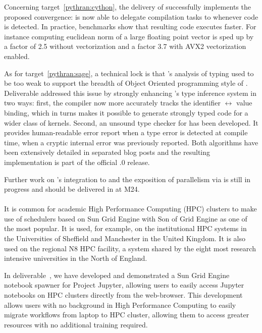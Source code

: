 \documentclass{deliverablereport}
\begin{document}
Concerning target~\ref{pythran:cython}, the delivery of  successfully implements the
proposed convergence: \Cython is now able to delegate compilation tasks to
\Pythran whenever \Numpy code is detected. In practice, benchmarks show that
resulting code executes faster. For instance computing euclidean norm of a large
floating point vector is sped up by a factor of 2.5 without vectorization and
a factor 3.7 with AVX2 vectorization enabled.

As for target~\ref{pythran:sage}, a technical lock is that \Pythran's analysis
of \Python typing used to be too weak to support the breadth of Object Oriented
programming style of \Sage. Deliverable 
addressed this issue by strongly enhancing \Pythran's type inference system in two ways: first, the compiler now more accurately tracks the identifier
$\leftrightarrow$ value binding, which in turns makes it possible to generate strongly
typed code for a wider class of \Python kernels.  Second, an unsound type checker for
\Pythran has been developed. It provides human-readable error report when a type error is
detected at compile time, when a cryptic internal error was previously reported. Both
algorithms have been extensively detailed in separated blog posts and the resulting
implementation is part of the official .0 release.

Further work on \Pythran's integration to \Sage and the exposition of
parallelism via  is still in progress and should be delivered in
 at M24.

  \paragraph{}
  
It is common for academic High Performance Computing (HPC) clusters to make
use of schedulers based on Sun Grid Engine with Son of Grid Engine as one of
the most popular. It is used, for example, on the institutional HPC systems
in the Universities of Sheffield and Manchester in the United Kingdom. It is also used
on the regional N8 HPC facility, a system shared by the eight most research
intensive universities in the North of England.

In deliverable~, we have developed and demonstrated a Sun Grid Engine
notebook spawner for Project Jupyter, allowing users to easily access
Jupyter notebooks on HPC clusters directly from the web-browser. This
development allows users with no background in High Performance Computing to
easily migrate workflows from laptop to HPC cluster, allowing them to access
greater resources with no additional training required.
  
\end{document}
